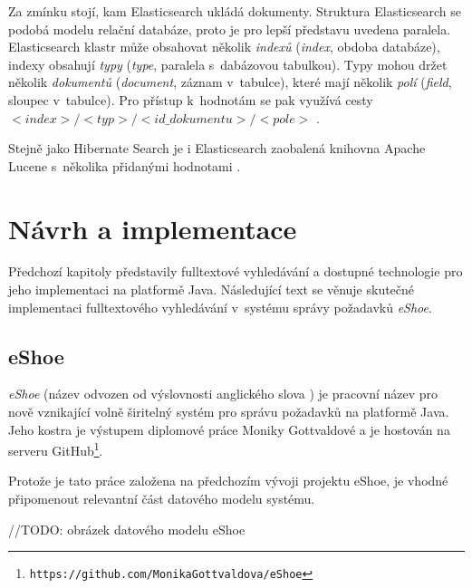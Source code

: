 \documentclass[11pt,oneside]{fithesis2}
\begin{document}
Za zmínku stojí, kam Elasticsearch ukládá dokumenty. Struktura Elasticsearch se podobá modelu relační databáze, proto je pro lepší představu uvedena paralela. Elasticsearch klastr může obsahovat několik \emph{indexů} (\emph{index}, obdoba databáze), indexy obsahují \emph{typy} (\emph{type}, paralela s~dabázovou tabulkou). Typy mohou držet několik \emph{dokumentů} (\emph{document}, záznam v~tabulce), které mají několik \emph{polí} (\emph{field}, sloupec v~tabulce). Pro přístup k~hodnotám se pak využívá cesty $<index>/<typ>/<id\_dokumentu>/<pole>$ \cite{ElasticsearchDefinitiveGuide}.

Stejně jako Hibernate Search je i Elasticsearch zaobalená knihovna Apache Lucene s~několika přidanými hodnotami \cite{ElasticsearchDefinitiveGuide}. 

\chapter{Návrh a implementace}
Předchozí kapitoly představily fulltextové vyhledávání a dostupné technologie pro jeho implementaci na platformě Java. Následující text se věnuje skutečné implementaci fulltextového vyhledávání v~systému správy požadavků \emph{eShoe}. 

\section{eShoe}
\emph{eShoe} (název odvozen od výslovnosti anglického slova ) je pracovní název pro nově vznikající volně širitelný systém pro správu požadavků na platformě Java. Jeho kostra je výstupem diplomové práce Moniky Gottvaldové \cite{eShoeDiplomka} a je hostován na serveru GitHub\footnote{\texttt{https://github.com/MonikaGottvaldova/eShoe}}.

Protože je tato práce založena na předchozím vývoji projektu eShoe, je vhodné připomenout relevantní část datového modelu systému.

//TODO: obrázek datového modelu eShoe
\end{document}
